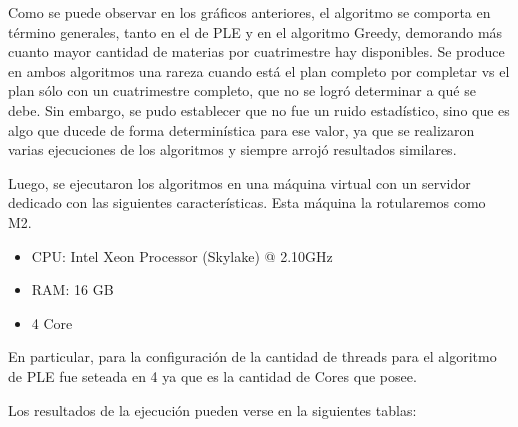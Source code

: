 \documentclass[a4paper]{article}
\begin{document}
Como se puede observar en los gráficos anteriores, el algoritmo se comporta en término generales, tanto en el de PLE y en el algoritmo Greedy, demorando más cuanto mayor cantidad de materias por cuatrimestre hay disponibles. Se produce en ambos algoritmos una rareza cuando está el plan completo por completar vs el plan sólo con un cuatrimestre completo, que no se logró determinar a qué se debe. Sin embargo, se pudo establecer que no fue un ruido estadístico, sino que es algo que ducede de forma determinística para ese valor, ya que se realizaron varias ejecuciones de los algoritmos y siempre arrojó resultados similares.

Luego, se ejecutaron los algoritmos en una máquina virtual con un servidor dedicado con las siguientes características. Esta máquina la rotularemos como M2.

\begin{itemize}
	\item CPU: Intel Xeon Processor (Skylake) @ 2.10GHz
	\item RAM: 16 GB
	\item 4 Core
\end{itemize}

En particular, para la configuración de la cantidad de threads para el algoritmo de PLE fue seteada en 4 ya que es la cantidad de Cores que posee.

Los resultados de la ejecución pueden verse en la siguientes tablas:
\end{document}

